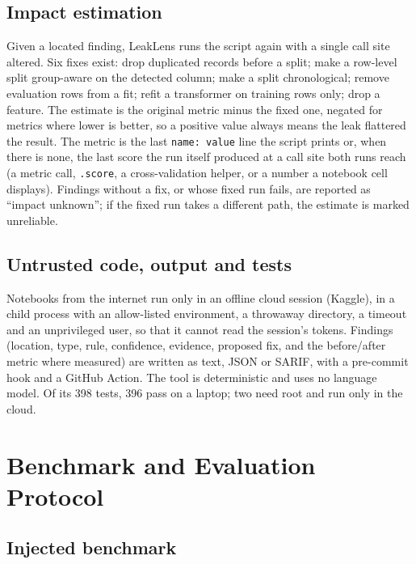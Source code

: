 \documentclass[conference]{IEEEtran}
\newcommand{\tool}{LeakLens}
\newcommand{\code}[1]{\texttt{#1}}
\begin{document}
\subsection{Impact estimation}

Given a located finding, \tool{} runs the script again with a single call site altered. Six fixes exist: drop duplicated
records before a split; make a row-level split group-aware on the detected column; make a split chronological;
remove evaluation rows from a fit; refit a transformer on training rows only; drop a feature. The estimate is the
original metric minus the fixed one, negated for metrics where lower is better, so a positive value always means
the leak flattered the result. The metric is the last \code{name: value} line the script prints or, when there is
none, the last score the run itself produced at a call site both runs reach (a metric call, \code{.score}, a
cross-validation helper, or a number a notebook cell displays). Findings without a fix, or whose fixed run fails,
are reported as ``impact unknown''; if the fixed run takes a different path, the estimate is marked unreliable.

\subsection{Untrusted code, output and tests}

Notebooks from the internet run only in an offline cloud session (Kaggle), in a child process with an allow-listed
environment, a throwaway directory, a timeout and an unprivileged user, so that it cannot read the session's
tokens. Findings (location, type, rule, confidence, evidence, proposed fix, and the before/after metric where
measured) are written as text, JSON or SARIF, with a pre-commit hook and a GitHub Action. The tool is deterministic
and uses no language model. Of its 398 tests, 396 pass on a laptop; two need root and run only in the cloud.

\section{Benchmark and Evaluation Protocol}

\subsection{Injected benchmark}
\end{document}
